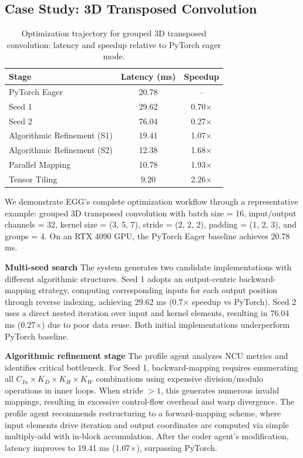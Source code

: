\documentclass{article}
\theoremstyle{plain}
\theoremstyle{definition}
\theoremstyle{remark}
\begin{document}
\subsection{Case Study: 3D Transposed Convolution}

\begin{table}
\centering
\caption{Optimization trajectory for grouped 3D transposed convolution: latency and speedup relative to PyTorch eager mode.}
\label{case}
\begin{tabular}{lcc}
\toprule
\textbf{Stage} & \textbf{Latency (ms)} & \textbf{Speedup} \\
\midrule
PyTorch Eager                & 20.78 & --    \\
\midrule
Seed 1                       & 29.62 & 0.70$\times$  \\
Seed 2                       & 76.04 & 0.27$\times$  \\
\midrule
Algorithmic Refinement (S1)  & 19.41 & 1.07$\times$  \\
Algorithmic Refinement (S2)  & 12.38 & 1.68$\times$  \\
\midrule
Parallel Mapping                 & 10.78 & 1.93$\times$   \\
Tensor Tiling                 &  9.20 & 2.26$\times$ \\
\bottomrule
\end{tabular}
\end{table}

We demonstrate EGG's complete optimization workflow through a representative example: grouped 3D transposed convolution with batch size = 16, input/output channels = 32, kernel size = (3, 5, 7), stride = (2, 2, 2), padding = (1, 2, 3), and groups = 4. On an RTX 4090 GPU, the PyTorch Eager baseline achieves 20.78 ms.

\textbf{Multi-seed search} The system generates two candidate implementations with different algorithmic structures. Seed 1 adopts an output-centric backward-mapping strategy, computing corresponding inputs for each output position through reverse indexing, achieving 29.62 ms (0.7$\times$ speedup vs PyTorch). Seed 2 uses a direct nested iteration over input and kernel elements, resulting in 76.04 ms (0.27$\times$) due to poor data reuse. Both initial implementations underperform PyTorch baseline.

\textbf{Algorithmic refinement stage} The profile agent analyzes NCU metrics and identifies critical bottleneck. For Seed 1, backward-mapping requires enumerating all $C_{In} \times K_D \times K_H \times K_W$ combinations using expensive division/modulo operations in inner loops. When stride $>1$, this generates numerous invalid mappings, resulting in excessive control-flow overhead and warp divergence. The profile agent recommends restructuring to a forward-mapping scheme, where input elements drive iteration and output coordinates are computed via simple multiply-add with in-block accumulation. After the coder agent's modification, latency improves to 19.41 ms (1.07$\times$), surpassing PyTorch.
\end{document}
